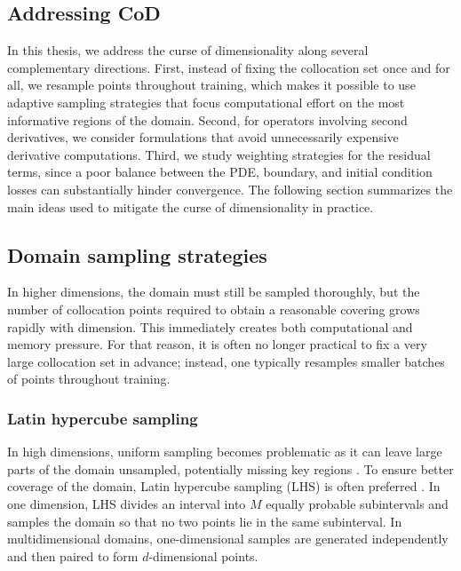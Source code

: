 \subsection{Addressing CoD}
%
In this thesis, we address the curse of dimensionality along several complementary directions.
First, instead of fixing the collocation set once and for all, we resample points throughout training, which makes it possible to use adaptive sampling strategies that focus computational effort on the most informative regions of the domain.
Second, for operators involving second derivatives, we consider formulations that avoid unnecessarily expensive derivative computations.
Third, we study weighting strategies for the residual terms, since a poor balance between the PDE, boundary, and initial condition losses can substantially hinder convergence.
The following section summarizes the main ideas used to mitigate the curse of dimensionality in practice.

\subsection{Domain sampling strategies}

In higher dimensions, the domain must still be sampled thoroughly, but the number of collocation points required to obtain a reasonable covering grows rapidly with dimension.
This immediately creates both computational and memory pressure.
For that reason, it is often no longer practical to fix a very large collocation set in advance; instead, one typically resamples smaller batches of points throughout training.

\subsubsection{Latin hypercube sampling}
In high dimensions, uniform sampling becomes problematic as it can leave large parts of the domain unsampled, potentially missing key regions \cite{latin}.
To ensure better coverage of the domain, Latin hypercube sampling (LHS) is often preferred \cite{systematic_review}.
In one dimension, LHS divides an interval into $M$ equally probable subintervals and samples the domain so that no two points lie in the same subinterval.
In multidimensional domains, one-dimensional samples are generated independently and then paired to form $d$-dimensional points.


